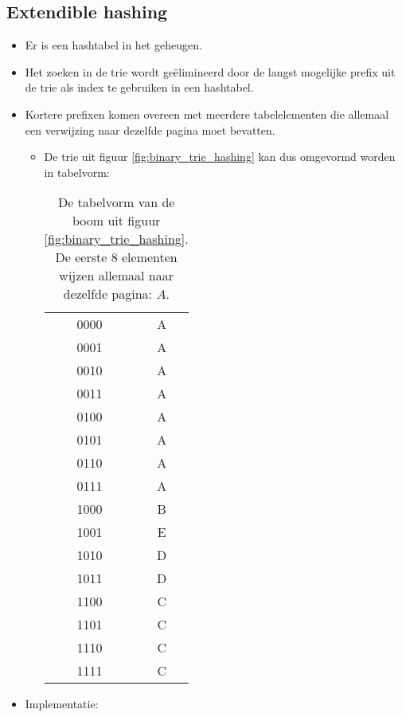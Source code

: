\subsection{Extendible hashing}
\begin{itemize}
    \item Er is een hashtabel in het geheugen.
    \item Het zoeken in de trie wordt geëlimineerd door de langst mogelijke prefix uit de trie als index te gebruiken in een hashtabel.
    \item Kortere prefixen komen overeen met meerdere tabelelementen die allemaal een verwijzing naar dezelfde pagina moet bevatten.
    \begin{itemize}
        \item De trie uit figuur \ref{fig:binary_trie_hashing} kan dus omgevormd worden in tabelvorm:
        \begin{table}[h]
            \centering
            \begin{tabular}{ | c | c |}
                \hline
                0000 & A \\
                0001 & A\\
                0010 & A\\
                0011 & A\\
                0100 & A\\
                0101 & A\\
                0110 & A\\
                0111 & A\\
                1000 & B\\
                1001 & E\\
                1010 & D\\
                1011 & D\\
                1100 & C\\
                1101 & C\\
                1110 & C\\
                1111 & C\\
                \hline
            \end{tabular}
            \caption{De tabelvorm van de boom uit figuur \ref{fig:binary_trie_hashing}. De eerste 8 elementen wijzen allemaal naar dezelfde pagina: $A$.}
        \end{table}
    \end{itemize}
    \item Implementatie:
    \begin{itemize}

\end{itemize}
\end{itemize}
